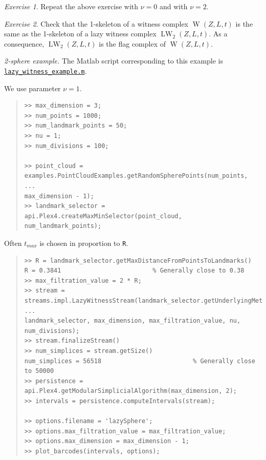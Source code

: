 \documentclass[amscd, amssymb, verbatim]{amsart}[12pt]
\theoremstyle{remark}
\newtheorem{exercise}{Exercise}
\theoremstyle{remark}
\theoremstyle{remark}
\DeclareMathOperator{\W}{W}
\DeclareMathOperator{\LW}{LW}
\begin{document}
\begin{exercise}
Repeat the above exercise with $\nu = 0$ and with $\nu = 2$. 
\end{exercise}

\begin{exercise}
Check that the 1-skeleton of a witness complex $\W(Z,L,t)$ is the same as the 1-skeleton of a lazy witness complex $\LW_2(Z,L,t)$. As a consequence, $\LW_2(Z,L,t)$ is the flag complex of $\W(Z,L,t)$. 
\end{exercise}

{\em 2-sphere example.} The Matlab script corresponding to this example is \href{https://github.com/appliedtopology/javaplex/tree/master/src/matlab/for_distribution/tutorial_examples/lazy_witness_example.m}{\texttt{lazy\_witness\_example.m}}.

We use parameter $\nu = 1$.

\begin{quote} \begin{verbatim}
>> max_dimension = 3;
>> num_points = 1000;
>> num_landmark_points = 50;
>> nu = 1;
>> num_divisions = 100;

>> point_cloud = examples.PointCloudExamples.getRandomSpherePoints(num_points, ...
max_dimension - 1);
>> landmark_selector = api.Plex4.createMaxMinSelector(point_cloud, num_landmark_points); 
\end{verbatim} \end{quote}

Often $t_{max}$ is chosen in proportion to \texttt{R}. 

\begin{quote} \begin{verbatim} 
>> R = landmark_selector.getMaxDistanceFromPointsToLandmarks()
R = 0.3841                         % Generally close to 0.38
>> max_filtration_value = 2 * R;
>> stream = streams.impl.LazyWitnessStream(landmark_selector.getUnderlyingMetricSpace(), ...
landmark_selector, max_dimension, max_filtration_value, nu, num_divisions); 
>> stream.finalizeStream()
>> num_simplices = stream.getSize()
num_simplices = 56518                         % Generally close to 50000
>> persistence = api.Plex4.getModularSimplicialAlgorithm(max_dimension, 2);
>> intervals = persistence.computeIntervals(stream);

>> options.filename = 'lazySphere';
>> options.max_filtration_value = max_filtration_value;
>> options.max_dimension = max_dimension - 1;
>> plot_barcodes(intervals, options);
\end{verbatim} \end{quote}
\end{document}
